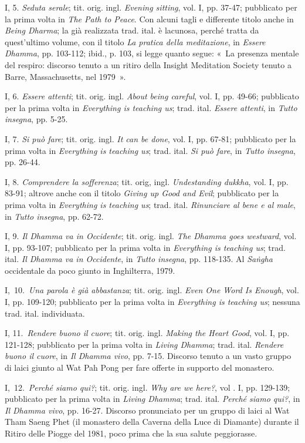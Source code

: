 I, 5. \emph{Seduta serale}; tit. orig. ingl. \emph{Evening sitting},
vol. I, pp. 37-47; pubblicato per la prima volta in \emph{The Path to
Peace}. Con alcuni tagli e differente titolo anche in \emph{Being
Dharma}; la già realizzata trad. ital. è lacunosa, perché tratta da
quest'ultimo volume, con il titolo \emph{La pratica della meditazione},
in \emph{Essere Dhamma}, pp. 103-112; ibid., p. 103, si legge quanto
segue: «~La presenza mentale del respiro: discorso tenuto a un ritiro
della Insight Meditation Society tenuto a Barre, Massachusetts, nel
1979~».

I, 6. \emph{Essere attenti}; tit. orig. ingl. \emph{About being
careful}, vol. I, pp. 49-66; pubblicato per la prima volta in
\emph{Everything is teaching us}; trad. ital. \emph{Essere attenti}, in
\emph{Tutto insegna}, pp. 5-25.

I, 7. \emph{Si può fare}; tit. orig. ingl. \emph{It can be done}, vol.
I, pp. 67-81; pubblicato per la prima volta in \emph{Everything is
teaching us}; trad. ital. \emph{Si può fare}, in \emph{Tutto insegna},
pp. 26-44.

I, 8. \emph{Comprendere la sofferenza}; tit. orig, ingl.
\emph{Undestanding dukkha}, vol. I, pp. 83-91; altrove anche con il
titolo \emph{Giving up Good and Evil}; pubblicato per la prima volta in
\emph{Everything is teaching us}; trad. ital. \emph{Rinunciare al bene e
al male}, in \emph{Tutto insegna}, pp. 62-72.

I, 9. \emph{Il Dhamma va in Occidente}; tit. orig. ingl. \emph{The
Dhamma goes westward}, vol. I, pp. 93-107; pubblicato per la prima volta
in \emph{Everything is teaching us}; trad. ital. \emph{Il Dhamma va in
Occidente}, in \emph{Tutto insegna}, pp. 118-135. Al \emph{Saṅgha}
occidentale da poco giunto in Inghilterra, 1979.

I,~10.~\emph{Una parola è già abbastanza}; tit. orig. ingl. \emph{Even
One Word Is Enough}, vol. I, pp. 109-120; pubblicato per la prima volta
in \emph{Everything is teaching us}; nessuna trad. ital. individuata.

I, 11.~\emph{Rendere buono il cuore}; tit. orig. ingl. \emph{Making the
Heart Good}, vol. I, pp. 121-128; pubblicato per la prima volta in
\emph{Living Dhamma}; trad. ital. \emph{Rendere buono il cuore}, in
\emph{Il Dhamma vivo}, pp. 7-15. Discorso tenuto a un vasto gruppo di
laici giunto al Wat Pah Pong per fare offerte in supporto del monastero.

I,~12.~\emph{Perché siamo qui?}; tit. orig. ingl. \emph{Why are we
here?}, vol . I, pp. 129-139; pubblicato per la prima volta in
\emph{Living Dhamma}; trad. ital. \emph{Perché siamo qui?}, in \emph{Il
Dhamma vivo}, pp. 16-27. Discorso pronunciato per un gruppo di laici al
Wat Tham Saeng Phet (il monastero della Caverna della Luce di Diamante)
durante il Ritiro delle Piogge del 1981, poco prima che la sua salute
peggiorasse.

